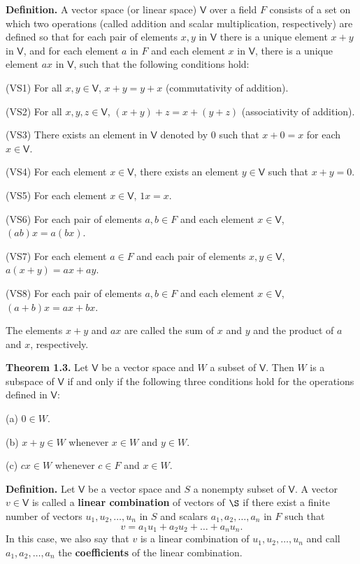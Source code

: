 \documentclass{article}
\newcommand{\0}{\mathit{0}}
\begin{document}
\textbf{Definition.}
A vector space (or linear space) $\mathsf{V}$ over a field $F$ consists of
a set on which two operations (called addition and scalar multiplication,
respectively) are defined so that for each pair of elements $x, y$ in
$\mathsf{V}$ there is a unique element $x + y$ in $\mathsf{V}$, and for
each element $a$ in $F$ and each element $x$ in $\mathsf{V}$, there is a
unique element $ax$ in $\mathsf{V}$, such that the following conditions hold:

(VS1) For all $x, y \in \mathsf{V}$, $x + y = y + x$ (commutativity of addition).

(VS2) For all $x, y, z \in \mathsf{V}$, $(x + y) + z = x + (y + z)$
(associativity of addition).

(VS3) There exists an element in $\mathsf{V}$ denoted by $\0$ such that
$x + \0 = x$ for each $x \in \mathsf{V}$.

(VS4) For each element $x \in \mathsf{V}$, there exists an element
$y \in \mathsf{V}$ such that $x + y = \0$.

(VS5) For each element $x \in \mathsf{V}$, $1x = x$.

(VS6) For each pair of elements $a, b \in F$ and each element
$x \in \mathsf{V}$, $(ab)x = a(bx)$.

(VS7) For each element $a \in F$ and each pair of elements
$x, y \in \mathsf{V}$, $a(x + y) = ax + ay$.

(VS8) For each pair of elements $a, b \in F$ and each element
$x \in \mathsf{V}$, $(a + b)x = ax + bx$.

The elements $x + y$ and $ax$ are called the sum of $x$ and $y$ and the
product of $a$ and $x$, respectively.

\medskip

\textbf{Theorem 1.3.}
Let $\mathsf{V}$ be a vector space and $W$ a subset of
$\mathsf{V}$. Then $W$ is a subspace of $\mathsf{V}$ if and
only if the following three conditions hold for the operations
defined in $\mathsf{V}$:

(a) $\0 \in W$.

(b) $x + y \in W$ whenever $x \in W$ and $y \in W$.

(c) $c x \in W$ whenever $c \in F$ and $x \in W$.

\medskip

\textbf{Definition.}
Let $\mathsf{V}$ be a vector space and $S$ a nonempty subset of
$\mathsf{V}$. A vector $v \in \mathsf{V}$ is called a \textbf{linear combination}
of vectors of $\S$ if there exist a finite number of vectors
$u_1, u_2, \dots, u_n$ in $S$ and scalars $a_1, a_2, \dots, a_n$
in $F$ such that
\[
    v = a_1 u_1 + a_2 u_2 + \dots + a_n u_n.
\]
In this case, we also say that $v$ is a linear combination of
$u_1, u_2, \dots, u_n$ and call $a_1, a_2, \dots, a_n$ the \textbf{coefficients}
of the linear combination.
\end{document}
